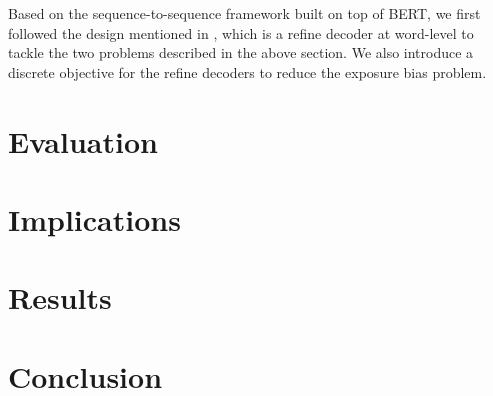 \documentclass[twoside,twocolumn]{article}
\begin{document}
Based on the sequence-to-sequence framework built on top
of BERT, we first followed the design mentioned in \cite{zhang2019pretraining}, which is a refine decoder at word-level to tackle the two problems described in the above section. We also introduce a discrete objective for the refine decoders to reduce the exposure bias problem.


\section{Evaluation}

\section{Implications}

\section{Results}



\section{Conclusion}






\printbibliography

  

\end{document}
